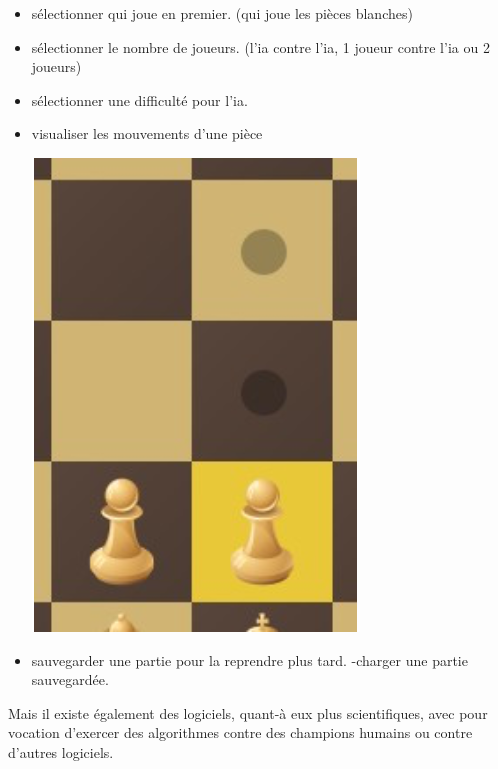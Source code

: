 \documentclass{article}
\begin{document}
\begin{itemize}
\item sélectionner qui joue en premier. (qui joue les pièces blanches)
\item sélectionner le nombre de joueurs. (l'ia contre l'ia, 1 joueur contre l'ia ou 2 joueurs)
\item sélectionner une difficulté pour l'ia.
\item visualiser les mouvements d'une pièce
\newline
\centerline{\includegraphics[scale = 0.5]{img/Piece_move.png}}
\item sauvegarder une partie pour la reprendre plus tard. -charger une partie sauvegardée.
\newline\newline
\end{itemize}
Mais il existe également des logiciels, quant-à eux plus scientifiques, avec pour vocation d'exercer  des algorithmes contre des champions humains ou contre d'autres logiciels.
\end{document}
